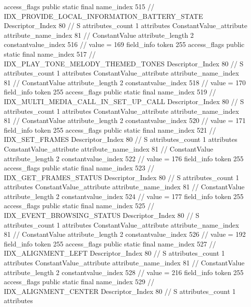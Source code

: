 {{{{{				access_flags	public static final
				name_index	515		// IDX_PROVIDE_LOCAL_INFORMATION_BATTERY_STATE
				Descriptor_Index	80		// S
				attributes_count	1
				attributes {
				ConstantValue_attribute {
					attribute_name_index	81		// ConstantValue
					attribute_length	2
					constantvalue_index	516		// value = 169
				}
				}
			}
			field_info {
				token	255
				access_flags	public static final
				name_index	517		// IDX_PLAY_TONE_MELODY_THEMED_TONES
				Descriptor_Index	80		// S
				attributes_count	1
				attributes {
				ConstantValue_attribute {
					attribute_name_index	81		// ConstantValue
					attribute_length	2
					constantvalue_index	518		// value = 170
				}
				}
			}
			field_info {
				token	255
				access_flags	public static final
				name_index	519		// IDX_MULTI_MEDIA_CALL_IN_SET_UP_CALL
				Descriptor_Index	80		// S
				attributes_count	1
				attributes {
				ConstantValue_attribute {
					attribute_name_index	81		// ConstantValue
					attribute_length	2
					constantvalue_index	520		// value = 171
				}
				}
			}
			field_info {
				token	255
				access_flags	public static final
				name_index	521		// IDX_SET_FRAMES
				Descriptor_Index	80		// S
				attributes_count	1
				attributes {
				ConstantValue_attribute {
					attribute_name_index	81		// ConstantValue
					attribute_length	2
					constantvalue_index	522		// value = 176
				}
				}
			}
			field_info {
				token	255
				access_flags	public static final
				name_index	523		// IDX_GET_FRAMES_STATUS
				Descriptor_Index	80		// S
				attributes_count	1
				attributes {
				ConstantValue_attribute {
					attribute_name_index	81		// ConstantValue
					attribute_length	2
					constantvalue_index	524		// value = 177
				}
				}
			}
			field_info {
				token	255
				access_flags	public static final
				name_index	525		// IDX_EVENT_BROWSING_STATUS
				Descriptor_Index	80		// S
				attributes_count	1
				attributes {
				ConstantValue_attribute {
					attribute_name_index	81		// ConstantValue
					attribute_length	2
					constantvalue_index	526		// value = 192
				}
				}
			}
			field_info {
				token	255
				access_flags	public static final
				name_index	527		// IDX_ALIGNMENT_LEFT
				Descriptor_Index	80		// S
				attributes_count	1
				attributes {
				ConstantValue_attribute {
					attribute_name_index	81		// ConstantValue
					attribute_length	2
					constantvalue_index	528		// value = 216
				}
				}
			}
			field_info {
				token	255
				access_flags	public static final
				name_index	529		// IDX_ALIGNMENT_CENTER
				Descriptor_Index	80		// S
				attributes_count	1
				attributes {
}}}}}}
